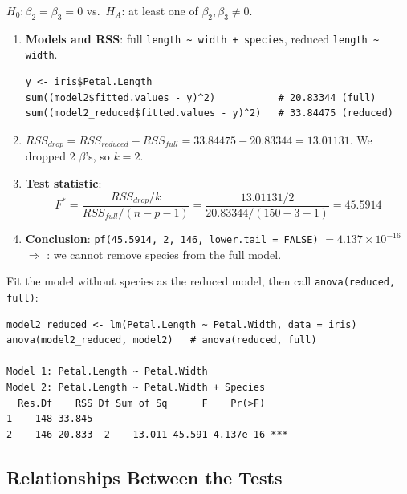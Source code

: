 \begin{example}
    $H_0:\beta_2=\beta_3=0$ vs.\ $H_A$: at least one of $\beta_2,\beta_3\neq0$.
    \begin{enumerate}
        \item \textbf{Models and RSS}: full \texttt{length \textasciitilde{} width + species},
        reduced \texttt{length \textasciitilde{} width}.
\begin{verbatim}
y <- iris$Petal.Length
sum((model2$fitted.values - y)^2)           # 20.83344 (full)
sum((model2_reduced$fitted.values - y)^2)   # 33.84475 (reduced)
\end{verbatim}
        \item $RSS_{drop}=RSS_{reduced}-RSS_{full}=33.84475-20.83344=13.01131$.
         We dropped 2 $\beta$'s, so $k=2$.
        \item \textbf{Test statistic}:
        \[F^*=\frac{RSS_{drop}/k}{RSS_{full}/(n-p-1)}=\frac{13.01131/2}{20.83344/(150-3-1)}=45.5914\]
        \item \textbf{Conclusion}: \texttt{pf(45.5914, 2, 146, lower.tail = FALSE)} $=4.137\times10^{-16}$
        $\Rightarrow$ : we cannot remove species from the full model.
    \end{enumerate}
\end{example}

\begin{example}
    Fit the model without species as the reduced model, then call \texttt{anova(reduced, full)}:
\begin{verbatim}
model2_reduced <- lm(Petal.Length ~ Petal.Width, data = iris)
anova(model2_reduced, model2)   # anova(reduced, full)

Model 1: Petal.Length ~ Petal.Width
Model 2: Petal.Length ~ Petal.Width + Species
  Res.Df    RSS Df Sum of Sq      F    Pr(>F)
1    148 33.845
2    146 20.833  2    13.011 45.591 4.137e-16 ***
\end{verbatim}
\end{example}

\subsection{Relationships Between the Tests}

